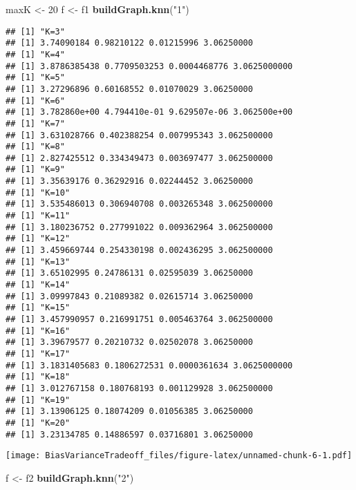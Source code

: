 \documentclass[]{article}
\newenvironment{Shaded}{\begin{snugshade}}{\end{snugshade}}
\newcommand{\DecValTok}[1]{\textcolor[rgb]{0.00,0.00,0.81}{#1}}
\newcommand{\KeywordTok}[1]{\textcolor[rgb]{0.13,0.29,0.53}{\textbf{#1}}}
\newcommand{\NormalTok}[1]{#1}
\newcommand{\StringTok}[1]{\textcolor[rgb]{0.31,0.60,0.02}{#1}}
\begin{document}
\begin{Shaded}
\begin{Highlighting}[]
\NormalTok{maxK <-}\StringTok{ }\DecValTok{20}
\NormalTok{f <-}\StringTok{ }\NormalTok{f1}
\KeywordTok{buildGraph.knn}\NormalTok{(}\StringTok{"1"}\NormalTok{)}
\end{Highlighting}
\end{Shaded}

\begin{verbatim}
## [1] "K=3"
## [1] 3.74090184 0.98210122 0.01215996 3.06250000
## [1] "K=4"
## [1] 3.8786385438 0.7709503253 0.0004468776 3.0625000000
## [1] "K=5"
## [1] 3.27296896 0.60168552 0.01070029 3.06250000
## [1] "K=6"
## [1] 3.782860e+00 4.794410e-01 9.629507e-06 3.062500e+00
## [1] "K=7"
## [1] 3.631028766 0.402388254 0.007995343 3.062500000
## [1] "K=8"
## [1] 2.827425512 0.334349473 0.003697477 3.062500000
## [1] "K=9"
## [1] 3.35639176 0.36292916 0.02244452 3.06250000
## [1] "K=10"
## [1] 3.535486013 0.306940708 0.003265348 3.062500000
## [1] "K=11"
## [1] 3.180236752 0.277991022 0.009362964 3.062500000
## [1] "K=12"
## [1] 3.459669744 0.254330198 0.002436295 3.062500000
## [1] "K=13"
## [1] 3.65102995 0.24786131 0.02595039 3.06250000
## [1] "K=14"
## [1] 3.09997843 0.21089382 0.02615714 3.06250000
## [1] "K=15"
## [1] 3.457990957 0.216991751 0.005463764 3.062500000
## [1] "K=16"
## [1] 3.39679577 0.20210732 0.02502078 3.06250000
## [1] "K=17"
## [1] 3.1831405683 0.1806272531 0.0000361634 3.0625000000
## [1] "K=18"
## [1] 3.012767158 0.180768193 0.001129928 3.062500000
## [1] "K=19"
## [1] 3.13906125 0.18074209 0.01056385 3.06250000
## [1] "K=20"
## [1] 3.23134785 0.14886597 0.03716801 3.06250000
\end{verbatim}

\texttt{[image: BiasVarianceTradeoff\_files/figure-latex/unnamed-chunk-6-1.pdf]}

\begin{Shaded}
\begin{Highlighting}[]
\NormalTok{f <-}\StringTok{ }\NormalTok{f2}
\KeywordTok{buildGraph.knn}\NormalTok{(}\StringTok{"2"}\NormalTok{)}
\end{Highlighting}
\end{Shaded}
\end{document}
